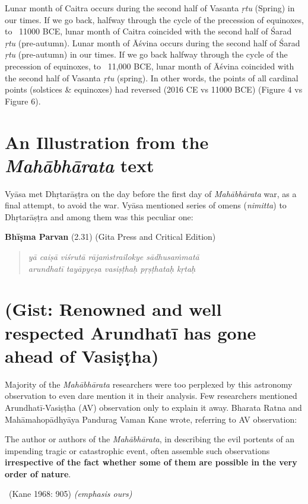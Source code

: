 \begin{enumerate}
Lunar month of Caitra occurs during the second half of Vasanta \textit{ṛtu} (Spring) in our times. If we go back, halfway through the cycle of the precession of equinoxes, to ~11000 BCE, lunar month of Caitra coincided with the second half of Śarad \textit{ṛtu} (pre-autumn). Lunar month of Āśvina occurs during the second half of Śarad \textit{ṛtu} (pre-autumn) in our times. If we go back halfway through the cycle of the precession of equinoxes, to ~11,000 BCE, lunar month of Āśvina coincided with the second half of Vasanta \textit{ṛtu} (spring). In other words, the points of all cardinal points (solstices \& equinoxes) had reversed (2016 CE vs 11000 BCE) (Figure 4 vs Figure 6).

\end{enumerate}


\section*{An Illustration from the \textit{Mahābhārata} text}

Vyāsa met Dhṛtarāṣṭra on the day before the first day of \textit{Mahābhārata} war, as a final attempt, to avoid the war. Vyāsa mentioned series of omens (\textit{nimitta}) to Dhṛtarāṣṭra and among them was this peculiar one:

\textbf{Bhīṣma Parvan} (2.31) (Gita Press and Critical Edition)

\begin{verse}
\textit{yā caiṣā viśrutā rājaṁstrailokye sādhusaṁmatā }\\\textit{arundhatī tayāpyeṣa vasiṣṭhaḥ pṛṣṭhataḥ kṛtaḥ }
\end{verse}

\vspace{-.3cm}

\section*{(Gist: Renowned and well respected Arundhatī has gone ahead of Vasiṣṭha)}

Majority of the \textit{Mahābhārata} researchers were too perplexed by this astronomy observation to even dare mention it in their analysis. Few researchers mentioned Arundhatī-Vasiṣṭha (AV) observation only to explain it away. Bharata Ratna and Mahāmahopādhyāya Pandurag Vaman Kane wrote, referring to AV observation:

\begin{myquote}
The author or authors of the \textit{Mahābhārata}, in describing the evil portents of an impending tragic or catastrophic event, often assemble such observations \textbf{irrespective of the fact whether some of them are possible in the very order of nature}. 

~\hfill (Kane 1968: 905) \textit{(emphasis ours)}
\end{myquote}

